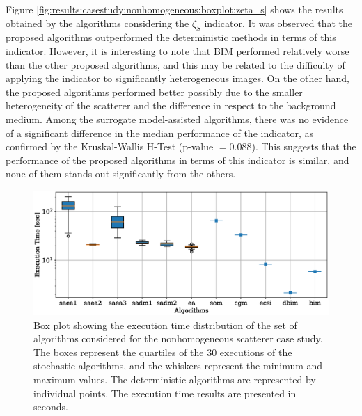 			Figure \ref{fig:results:casestudy:nonhomogeneous:boxplot:zeta_s} shows the results obtained by the algorithms considering the $\zeta_S$ indicator. It was observed that the proposed algorithms outperformed the deterministic methods in terms of this indicator. However, it is interesting to note that BIM performed relatively worse than the other proposed algorithms, and this may be related to the difficulty of applying the indicator to significantly heterogeneous images. On the other hand, the proposed algorithms performed better possibly due to the smaller heterogeneity of the scatterer and the difference in respect to the background medium. Among the surrogate model-assisted algorithms, there was no evidence of a significant difference in the median performance of the indicator, as confirmed by the Kruskal-Wallis H-Test (p-value $= 0.088$). This suggests that the performance of the proposed algorithms in terms of this indicator is similar, and none of them stands out significantly from the others.
		
			\begin{figure}
				\centering
				\includegraphics[width=.9\textwidth]{./figuras/casestudy/nonhomogeneous/boxplot_time}
				\caption[Box plot showing the execution time distribution of the set of algorithms considered for the nonhomogeneous scatterer case study.]{Box plot showing the execution time distribution of the set of algorithms considered for the nonhomogeneous scatterer case study. The boxes represent the quartiles of the 30 executions of the stochastic algorithms, and the whiskers represent the minimum and maximum values. The deterministic algorithms are represented by individual points. The execution time results are presented in seconds.}
				\label{fig:results:casestudy:nonhomogeneous:boxplot:time}
			\end{figure}
		
			
